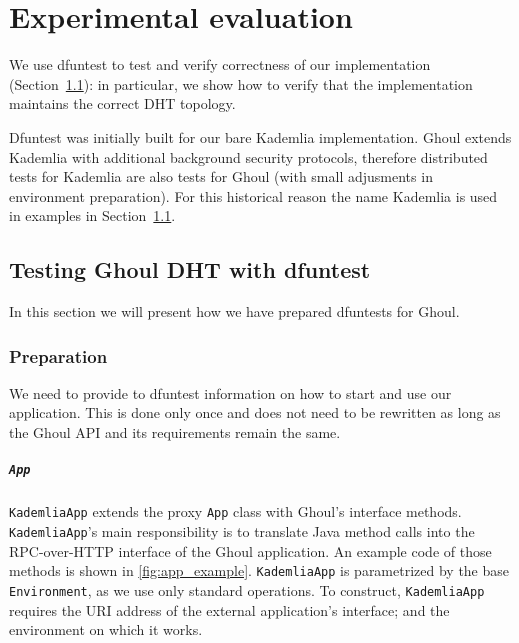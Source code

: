\chapter{Experimental evaluation}
\label{ch:evaluation}

We use dfuntest to test and verify correctness of our implementation
(Section~\ref{sec:exampl-test-kademl}): in particular, we show how to verify
that the implementation maintains the correct DHT topology.

Dfuntest was initially built for our bare Kademlia implementation.
Ghoul extends Kademlia with additional background security protocols, therefore distributed tests for Kademlia are also tests for Ghoul (with small adjusments in environment preparation).
For this historical reason the name Kademlia is used in examples in
Section~\ref{sec:exampl-test-kademl}.
\section{Testing Ghoul DHT with dfuntest}
\label{sec:exampl-test-kademl}
In this section we will present how we have prepared dfuntests for Ghoul.

\subsection{Preparation}
We need to provide to dfuntest information on how to start and use our
application. This is done only once and does not need to be rewritten as long as
the Ghoul API and its requirements remain the same.

\paragraph{\texttt{App}} 
\texttt{KademliaApp} extends the proxy \texttt{App} class with Ghoul's interface methods.
\texttt{KademliaApp}'s main responsibility is to translate Java method calls into the RPC-over-HTTP interface of the Ghoul application.
An example code of those methods is shown in \ref{fig:app_example}.
\texttt{KademliaApp} is parametrized by the base \texttt{Environment}, as we use only standard operations.
To construct, \texttt{KademliaApp} requires the URI address of the external
application's interface; and the environment on which it works.


